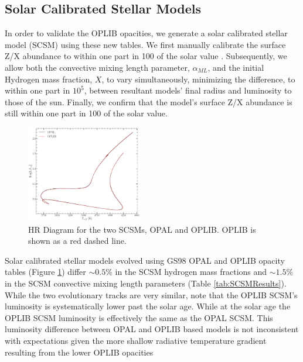 \subsection{Solar Calibrated Stellar Models}\label{sec:SCSM}


In order to validate the OPLIB opacities, we generate a solar calibrated
stellar model (SCSM) using these new tables. We first manually calibrate the
surface Z/X abundance to within one part in 100 of the solar value \textbf{\citep[][Z/X=0.23]{Grevesse1998}}.
Subsequently, we allow both the convective mixing length parameter,
$\alpha_{ML}$, and the initial Hydrogen mass fraction, $X$, to vary
simultaneously, minimizing the difference, to within one part in $10^{5}$,
between resultant models' final radius and luminosity to those of the sun.
Finally, we confirm that the model's surface Z/X abundance is still within one
part in 100 of the solar value.

\begin{figure}
	\centering
	\includegraphics[width=0.45\textwidth]{HRDiagramOPALvsOPLIB_SCCM.pdf}
	\caption{HR Diagram for the two SCSMs, OPAL and OPLIB. OPLIB is shown as a red
	dashed line.}
	\label{fig:OPLIBOPALHR}
\end{figure}

Solar calibrated stellar models evolved using GS98 OPAL and OPLIB opacity
tables (Figure \ref{fig:OPLIBOPALHR}) differ $\sim 0.5\%$ in the SCSM hydrogen
mass fractions and $\sim 1.5\%$ in the SCSM convective mixing length parameters
(Table \ref{tab:SCSMResults}). While the two evolutionary tracks are very
similar, note that the OPLIB SCSM's luminosity is systematically lower past the
solar age. While at the solar age the OPLIB SCSM luminosity is effectively the
same as the OPAL SCSM. This luminosity difference between OPAL and OPLIB based
models is not inconsistent with expectations given the more shallow radiative
temperature gradient resulting from the lower OPLIB opacities

